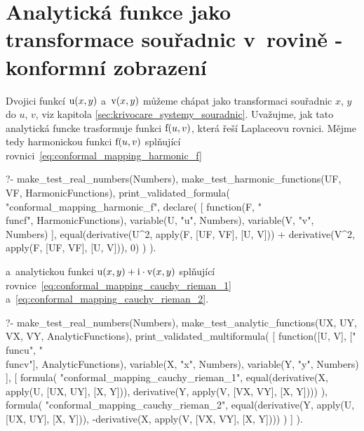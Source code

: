 
\section{Analytická funkce jako transformace souřadnic v~rovině - konformní zobrazení}

Dvojici funkcí \(\mathrm{u}(x, y)\) a~\(\mathrm{v}(x, y)\) můžeme chápat jako transformaci souřadnic \(x\), \(y\) do \(u\), \(v\), viz kapitola \ref{sec:krivocare_systemy_souradnic}. Uvažujme, jak tato analytická funcke trasformuje funkci \(\mathrm{f}(u, v)\), která řeší Laplaceovu rovnici. Mějme tedy harmonickou funkci \(\mathrm{f}(u, v)\) splňující rovnici~\eqref{eq:conformal_mapping_harmonic_f}

\begin{prolog}
?-	make_test_real_numbers(Numbers),
	make_test_harmonic_functions(UF, VF, HarmonicFunctions),
	print_validated_formula(
		"conformal_mapping_harmonic_f",
		declare(
			[
				function(F, "\\func{f}", HarmonicFunctions),
				variable(U, "u", Numbers),
				variable(V, "v", Numbers)
			],
			equal(derivative(U^2, apply(F, [UF, VF], [U, V])) + derivative(V^2, apply(F, [UF, VF], [U, V])), 0)
		)
	).
\end{prolog}

a~analytickou funkci \(\mathrm{u}(x, y) + \mathrm{i} \cdot \mathrm{v}(x, y)\) splňující rovnice~\eqref{eq:conformal_mapping_cauchy_rieman_1} a~\eqref{eq:conformal_mapping_cauchy_rieman_2}.

\begin{prolog}
?-	make_test_real_numbers(Numbers),
	make_test_analytic_functions(UX, UY, VX, VY, AnalyticFunctions),
	print_validated_multiformula(
		[
			function([U, V], ["\\func{u}", "\\func{v}"], AnalyticFunctions),
			variable(X, "x", Numbers),
			variable(Y, "y", Numbers)
		],
		[
			formula(
				"conformal_mapping_cauchy_rieman_1",
				equal(derivative(X, apply(U, [UX, UY], [X, Y])), derivative(Y, apply(V, [VX, VY], [X, Y])))
			),
			formula(
				"conformal_mapping_cauchy_rieman_2",
				equal(derivative(Y, apply(U, [UX, UY], [X, Y])), -derivative(X, apply(V, [VX, VY], [X, Y])))
			)
		]
	).
\end{prolog}

